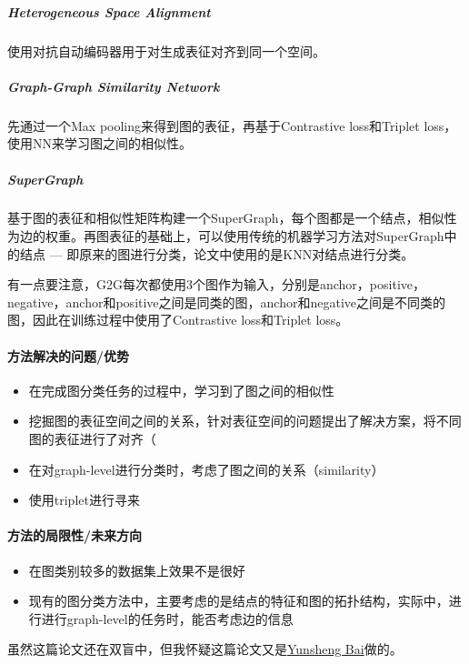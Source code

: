 \subparagraph{Heterogeneous Space Alignment}使用对抗自动编码器\cite{makhzani2016adversarial}用于对生成表征对齐到同一个空间。

\subparagraph{Graph-Graph Similarity Network}先通过一个Max pooling来得到图的表征，再基于Contrastive loss和Triplet loss，使用NN来学习图之间的相似性。

\subparagraph{SuperGraph}基于图的表征和相似性矩阵构建一个SuperGraph，每个图都是一个结点，相似性为边的权重。再图表征的基础上，可以使用传统的机器学习方法对SuperGraph中的结点 --- 即原来的图进行分类，论文中使用的是KNN对结点进行分类。
\newline

有一点要注意，G2G每次都使用3个图作为输入，分别是anchor，positive，negative，anchor和positive之间是同类的图，anchor和negative之间是不同类的图，因此在训练过程中使用了Contrastive loss和Triplet loss。

\paragraph{方法解决的问题/优势}
\begin{itemize}
	\item 在完成图分类任务的过程中，学习到了图之间的相似性
	\item 挖掘图的表征空间之间的关系，针对表征空间的问题提出了解决方案，将不同图的表征进行了对齐（
	\item 在对graph-level进行分类时，考虑了图之间的关系（similarity）
	\item 使用triplet进行寻来
\end{itemize}

\paragraph{方法的局限性/未来方向}
\begin{itemize}
	\item 在图类别较多的数据集上效果不是很好
	\item 现有的图分类方法中，主要考虑的是结点的特征和图的拓扑结构，实际中，进行进行graph-level的任务时，能否考虑边的信息

\end{itemize}


虽然这篇论文还在双盲中，但我怀疑这篇论文又是\href{http://yunshengb.com/}{Yunsheng Bai}做的。



